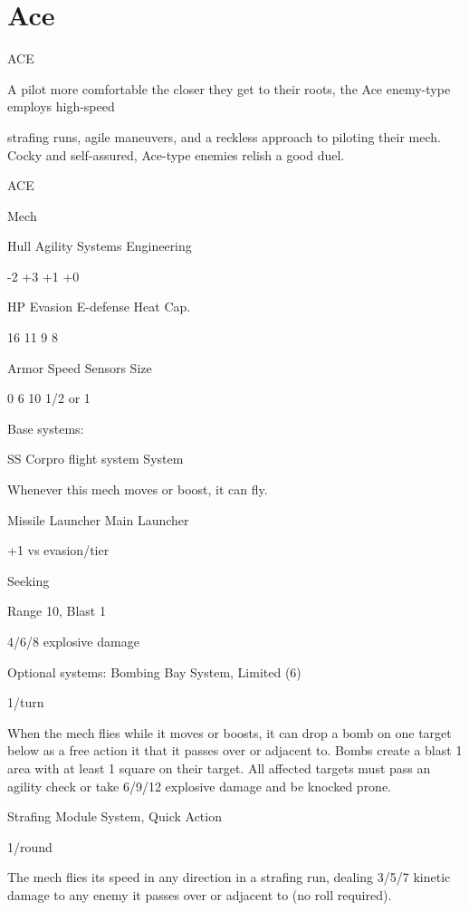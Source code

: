 \section{Ace}
                                                  ACE  

A pilot more comfortable the closer they get to their roots, the Ace enemy-type employs high-speed  

strafing runs, agile maneuvers, and a reckless approach to piloting their mech. Cocky and self-assured,  
Ace-type enemies relish a good duel.  
 

 ACE 

 Mech 

 Hull       Agility     Systems       Engineering 

 -2         +3          +1            +0 

 HP         Evasion     E-defense     Heat Cap. 

 16         11          9             8 

 Armor      Speed       Sensors       Size 

 0          6           10            1/2 or 1 

Base systems:
 
SS Corpro flight system  
System
 
Whenever this mech moves or boost, it can fly.
 

Missile Launcher  
Main Launcher
 
+1 vs evasion/tier
 
Seeking
 
Range 10, Blast 1
 
4/6/8 explosive damage
 

Optional systems:  
Bombing Bay  
System, Limited (6)
 
1/turn
 
When the mech flies while it moves or boosts, it can drop a bomb on one target below as a free  
action it that it passes over or adjacent to. Bombs create a blast 1 area with at least 1 square on  
their target. All affected targets must pass an agility check or take 6/9/12 explosive damage and  
be knocked prone.
 

                                                                                                       


Strafing Module  
System, Quick Action
 
1/round
 
The mech flies its speed in any direction in a strafing run, dealing 3/5/7 kinetic damage to any  
enemy it passes over or adjacent to (no roll required).
 

